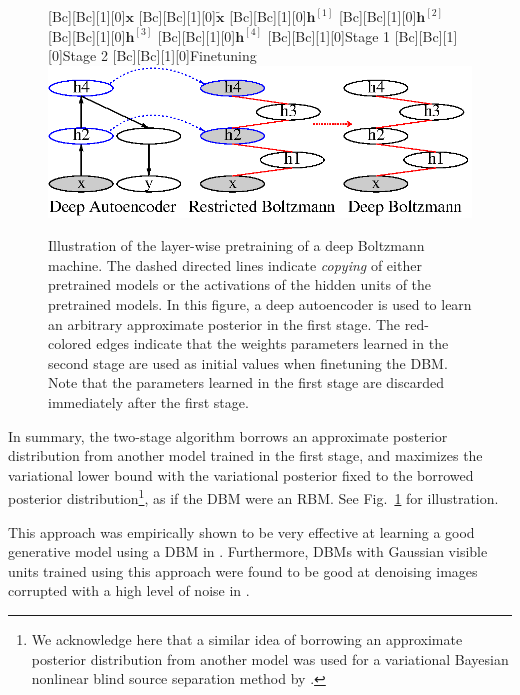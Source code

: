 \documentclass[dissertation,nocontribution]{aaltoseries}
\newcommand{\qlay}[1]{\left[#1\right]}
\newcommand{\vect}[1]{\mathbf{#1}}
\newcommand{\vh}[0]{\vect{h}}
\newcommand{\vx}[0]{\vect{x}}
\begin{document}
\begin{figure}[t]
    \centering
    [Bc][Bc][1][0]{$\vx$}
    [Bc][Bc][1][0]{$\tilde{\vx}$}
    [Bc][Bc][1][0]{$\vh^{\qlay{1}}$}
    [Bc][Bc][1][0]{$\vh^{\qlay{2}}$}
    [Bc][Bc][1][0]{$\vh^{\qlay{3}}$}
    [Bc][Bc][1][0]{$\vh^{\qlay{4}}$}
    [Bc][Bc][1][0]{Stage 1}
    [Bc][Bc][1][0]{Stage 2}
    [Bc][Bc][1][0]{Finetuning}
    \includegraphics[width=0.85\columnwidth]{figures/pretrain_dbm2.eps}
    \caption{Illustration of the layer-wise pretraining of
    a deep Boltzmann machine. The dashed directed lines
    indicate \textit{copying} of either pretrained models or
    the activations of the hidden units of the pretrained
    models. In this figure, a deep autoencoder is used to
    learn an arbitrary approximate posterior in the first
    stage. The red-colored edges indicate that the weights
    parameters learned in the second stage are used as
    initial values when finetuning the DBM. Note that the
    parameters learned in the first stage are discarded
    immediately after the first stage.}
    \label{fig:two_stage_pretraining}
\end{figure}

In summary, the two-stage algorithm borrows an approximate
posterior distribution from another model trained in the
first stage, and maximizes the variational lower bound with
the variational posterior fixed to the borrowed posterior
distribution\footnote{
We acknowledge here that a similar idea of borrowing an
approximate posterior distribution from another model was
used for a variational Bayesian nonlinear blind source
separation method by \citet{Honkela2004}.
}, as if the DBM were an RBM. See
Fig.~\ref{fig:two_stage_pretraining} for illustration.

This approach was empirically shown to be very effective at
learning a good generative model using a DBM in
. Furthermore, DBMs with Gaussian
visible units trained using this approach were found to be
good at denoising images corrupted with a high level of noise
in .
\end{document}
